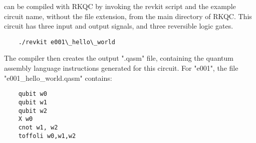 can be compiled with RKQC by invoking the revkit script and the example circuit name, without the file extension, from the main directory of RKQC. This circuit has three input and output signals, and three reversible logic gates.  

\begin{lstlisting}
	./revkit e001\_hello\_world
\end{lstlisting}

The compiler then creates the output ".qasm" file, containing the quantum assembly language instructions generated for this circuit. For "e001", the file "e001\_hello\_world.qasm" contains:

\begin{lstlisting}
    qubit w0
    qubit w1
    qubit w2
    X w0
    cnot w1, w2
    toffoli w0,w1,w2
\end{lstlisting}



